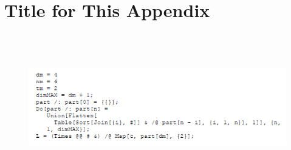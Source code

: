 
\cleardoublepage

\chapter{Title for This Appendix}
\label{Appendix:Key1}

\begin{figure}[htb]%

    \includegraphics[height=2.5in]{figures/dimpheli1a.png}

\end{figure}


